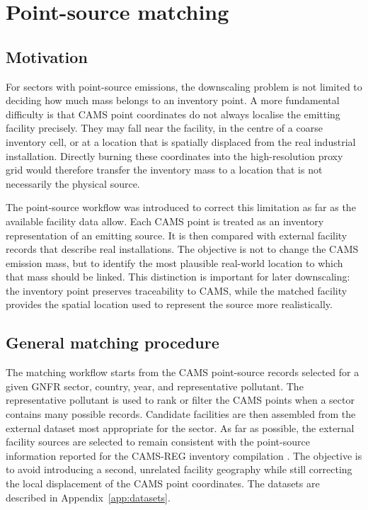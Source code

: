 \section{Point-source matching}
\label{sec:point-source-matching}

\subsection{Motivation}

For sectors with point-source emissions, the downscaling problem is not
limited to deciding how much mass belongs to an inventory point. A more
fundamental difficulty is that CAMS point coordinates do not always
localise the emitting facility precisely. They may fall near the
facility, in the centre of a coarse inventory cell, or at a location that
is spatially displaced from the real industrial installation. Directly
burning these coordinates into the high-resolution proxy grid would
therefore transfer the inventory mass to a location that is not
necessarily the physical source.

The point-source workflow was introduced to correct this limitation as
far as the available facility data allow. Each CAMS point is treated as
an inventory representation of an emitting source. It is then compared
with external facility records that describe real installations. The
objective is not to change the CAMS emission mass, but to identify the
most plausible real-world location to which that mass should be linked.
This distinction is important for later downscaling: the inventory point
preserves traceability to CAMS, while the matched facility provides the
spatial location used to represent the source more realistically.

\subsection{General matching procedure}

The matching workflow starts from the CAMS point-source records selected
for a given GNFR sector, country, year, and representative pollutant. The
representative pollutant is used to rank or filter the CAMS points when
a sector contains many possible records. Candidate facilities are then
assembled from the external dataset most appropriate for the sector. As
far as possible, the external facility sources are selected to remain
consistent with the point-source information reported for the CAMS-REG
inventory compilation \citep{CAMS-REG-v4}. The objective is to avoid
introducing a second, unrelated facility geography while still correcting
the local displacement of the CAMS point coordinates. The datasets are
described in Appendix~\ref{app:datasets}.

